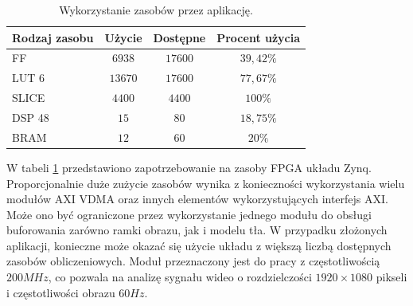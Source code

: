 \begin{table}[h]
	\caption{Wykorzystanie zasobów przez aplikację.}
	\centering
	\label{tab;background-model-utilization}
	\begin{tabular}{|l|c|c|c|}
		\hline
		\textbf{Rodzaj zasobu} & \textbf{Użycie} & \textbf{Dostępne} & \textbf{Procent użycia}      \\ \hline
		FF                     & $6938$            & $17600$             & $39,42\%$                 \\ \hline
		LUT 6                  & $13670$            & $17600$             & $77,67\%$                 \\ \hline
		SLICE                  & $4400$            & $4400$             & $100\%$                 \\ \hline
		DSP 48                 & $15$               & $80$                & $18,75\%$                    \\ \hline
		BRAM                   & $12$               & $60$                & $20\%$                   \\ \hline
	\end{tabular}
\end{table}

W tabeli \ref{tab;background-model-utilization} przedstawiono zapotrzebowanie na zasoby FPGA układu Zynq.
Proporcjonalnie duże zużycie zasobów wynika z konieczności wykorzystania wielu modułów AXI VDMA oraz innych elementów wykorzystujących interfejs AXI. 
Może ono być ograniczone przez wykorzystanie jednego modułu do obsługi buforowania zarówno ramki obrazu, jak i modelu tła. 
W przypadku złożonych aplikacji, konieczne może okazać się użycie układu z większą liczbą dostępnych zasobów obliczeniowych. %
Moduł przeznaczony jest do pracy z częstotliwością $200MHz$, co pozwala na analizę sygnału wideo o rozdzielczości $1920 \times 1080$ pikseli i częstotliwości obrazu $60Hz$.

